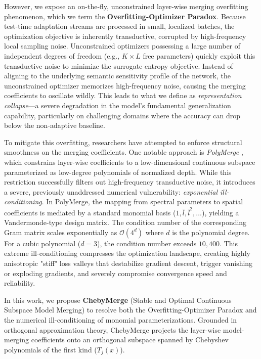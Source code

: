 However, we expose an on-the-fly, unconstrained layer-wise merging overfitting phenomenon, which we term the \textbf{Overfitting-Optimizer Paradox}. Because test-time adaptation streams are processed in small, localized batches, the optimization objective is inherently transductive, corrupted by high-frequency local sampling noise. Unconstrained optimizers possessing a large number of independent degrees of freedom (e.g., $K \times L$ free parameters) quickly exploit this transductive noise to minimize the surrogate entropy objective. Instead of aligning to the underlying semantic sensitivity profile of the network, the unconstrained optimizer memorizes high-frequency noise, causing the merging coefficients to oscillate wildly. This leads to what we define as \emph{representation collapse}---a severe degradation in the model's fundamental generalization capability, particularly on challenging domains where the accuracy can drop below the non-adaptive baseline.

To mitigate this overfitting, researchers have attempted to enforce structural smoothness on the merging coefficients. One notable approach is \emph{PolyMerge} \cite{polymerge2024}, which constrains layer-wise coefficients to a low-dimensional continuous subspace parameterized as low-degree polynomials of normalized depth. While this restriction successfully filters out high-frequency transductive noise, it introduces a severe, previously unaddressed numerical vulnerability: \emph{exponential ill-conditioning}. In PolyMerge, the mapping from spectral parameters to spatial coefficients is mediated by a standard monomial basis ($1, \bar{l}, \bar{l}^2, \dots$), yielding a Vandermonde-type design matrix. The condition number of the corresponding Gram matrix scales exponentially as $\mathcal{O}(4^d)$ where $d$ is the polynomial degree. For a cubic polynomial ($d=3$), the condition number exceeds $10,400$. This extreme ill-conditioning compresses the optimization landscape, creating highly anisotropic "stiff" loss valleys that destabilize gradient descent, trigger vanishing or exploding gradients, and severely compromise convergence speed and reliability.

In this work, we propose \textbf{ChebyMerge} (Stable and Optimal Continuous Subspace Model Merging) to resolve both the Overfitting-Optimizer Paradox and the numerical ill-conditioning of monomial parameterizations. Grounded in orthogonal approximation theory, ChebyMerge projects the layer-wise model-merging coefficients onto an orthogonal subspace spanned by Chebyshev polynomials of the first kind ($T_j(x)$). 

